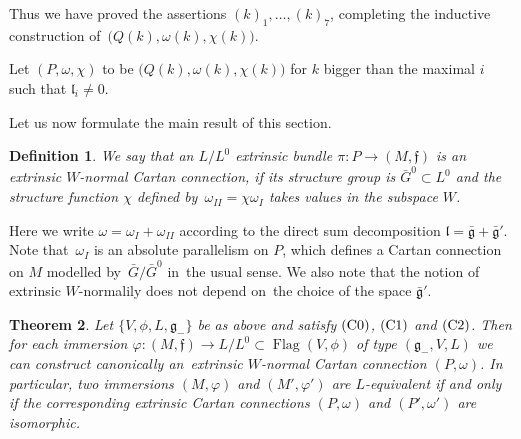 \documentclass[pdftex]{sigma}%
\newcommand{\geneg}{\mathfrak g _-}
\newcommand{\gebar}{\bar{\mathfrak g}}
\newcommand{\f}{\mathfrak f}
\newcommand{\lf}{\mathfrak l}
\newcommand{\om}{\omega}
\newcommand{\Flag}{\operatorname{Flag}}
\newtheorem{thm}{Theorem}[section]
\newtheorem{df}[thm]{Definition}
\numberwithin{equation}{section}
\begin{document}
Thus we have proved the assertions $(k)_1, \ldots , (k)_7 $,
completing the inductive construction of~$\big(Q(k), \omega(k), \chi(k) \big)$.

Let $(P,\omega ,\chi)$ to be $\big(Q(k),\omega(k),\chi(k)\big)$ for $k$ bigger than the maximal $i$ such that $\lf_i\ne 0$.


Let us now formulate the main result of this section.
\begin{df}
	We say that an $L/L^0$ extrinsic bundle $\pi\colon P\to (M,\f)$ is
	\emph{an extrinsic $W$-normal Cartan connection}, if its structure group is $\bar G^0\subset L^0$ and the structure function $\chi$ defined by~$\om_{II}=\chi \om_I$ takes values in the subspace $W$.
\end{df}
Here we write $ \omega = \omega_I + \omega_{II} $ according to the direct sum decomposition $ \lf = \gebar + \gebar'$. Note that~$\omega_I$ is an absolute parallelism on $P$, which defines a Cartan connection on $M$ modelled by~$\bar G / \bar G^0$ in~the usual sense. We also note that the notion of extrinsic $W$-normalily does not depend on~the choice of the space $\gebar'$.

\begin{thm}\label{thm:reduction}
	Let $\{ V, \phi, L, \geneg \} $ be as above and satisfy
	${\rm (C0)}$, ${\rm (C1)}$ and ${\rm (C2)}$. Then for each immersion $\varphi\colon (M, \f) \to
	L/L^0 \subset \Flag (V, \phi)$ of type $(\geneg, V, L)$ we can construct canonically an~ext\-ri\-nsic $W$-normal Cartan connection $(P,\om)$. 	In particular, two immersions $(M, \varphi)$ and $(M', \varphi ')$ 	are $L$-equivalent if and only if the corresponding extrinsic Cartan connections $(P,\omega)$ and $(P',\omega')$ are isomorphic.
\end{thm}
\end{document}
